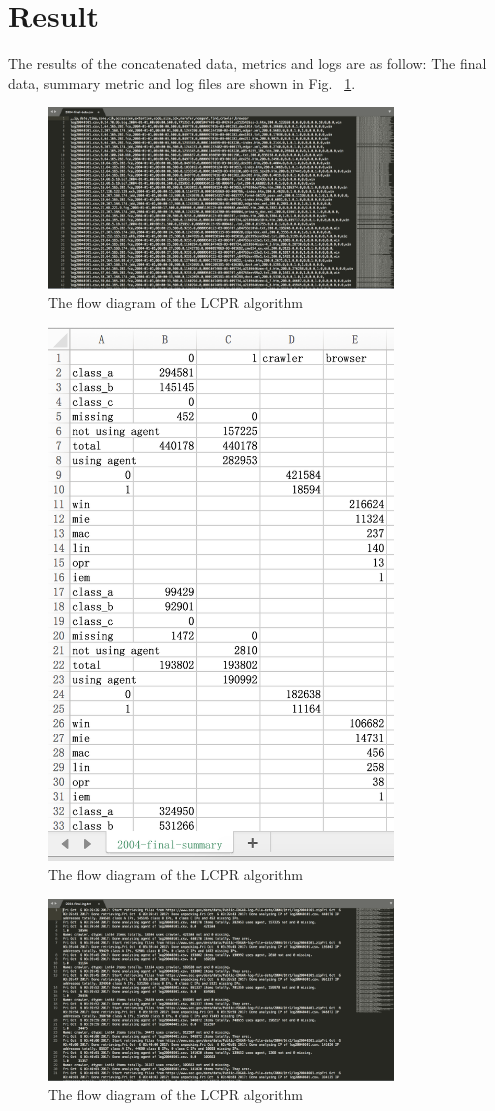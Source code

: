 \documentclass[conference]{IEEEtran}
\begin{document}
\section{Result}\label{iv}
\indent The results of the concatenated data, metrics and logs are as follow:
\indent The final data, summary metric and log files are shown in Fig. ~\ref{data}.
\begin{figure}
\centering
\includegraphics[width=3.6in]{final-data.png}
\caption{The flow diagram of the LCPR algorithm}\label{data}
\end{figure}
\begin{figure}
\centering
\includegraphics[width=3.6in]{final-sum.png}
\caption{The flow diagram of the LCPR algorithm}\label{sum}
\end{figure}
\begin{figure}
\centering
\includegraphics[width=3.6in]{final-log.png}
\caption{The flow diagram of the LCPR algorithm}\label{log}
\end{figure}
\end{document}
